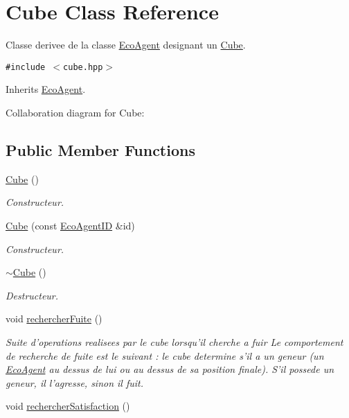 \hypertarget{classCube}{
\section{Cube Class Reference}
\label{classCube}
}
Classe derivee de la classe \hyperlink{classEcoAgent}{EcoAgent} designant un \hyperlink{classCube}{Cube}.  


{\tt \#include $<$cube.hpp$>$}

Inherits \hyperlink{classEcoAgent}{EcoAgent}.

Collaboration diagram for Cube:\subsection*{Public Member Functions}
\begin{CompactItemize}
\item 
\hyperlink{classCube_06f3d86fb63e3aad08623610aa3c17b4}{Cube} ()
\begin{CompactList}\small\item\em Constructeur. \item\end{CompactList}\item 
\hyperlink{classCube_4793068a114fd49b51233e8f81884189}{Cube} (const \hyperlink{classEcoAgentID}{EcoAgentID} \&id)
\begin{CompactList}\small\item\em Constructeur. \item\end{CompactList}\item 
\hyperlink{classCube_a814e979cecb8c451fdb332ded2cea1e}{$\sim$Cube} ()
\begin{CompactList}\small\item\em Destructeur. \item\end{CompactList}\item 
\hypertarget{classCube_c81ac3b8da58ba8463d72e3a0433bafa}{
void \hyperlink{classCube_c81ac3b8da58ba8463d72e3a0433bafa}{rechercherFuite} ()}
\label{classCube_c81ac3b8da58ba8463d72e3a0433bafa}

\begin{CompactList}\small\item\em Suite d'operations realisees par le cube lorsqu'il cherche a fuir Le comportement de recherche de fuite est le suivant : le cube determine s'il a un geneur (un \hyperlink{classEcoAgent}{EcoAgent} au dessus de lui ou au dessus de sa position finale). S'il possede un geneur, il l'agresse, sinon il fuit. \item\end{CompactList}\item 
\hypertarget{classCube_10f69d54f313f48ac0c8468628ac6902}{
void \hyperlink{classCube_10f69d54f313f48ac0c8468628ac6902}{rechercherSatisfaction} ()}
\label{classCube_10f69d54f313f48ac0c8468628ac6902}


\end{CompactItemize}
